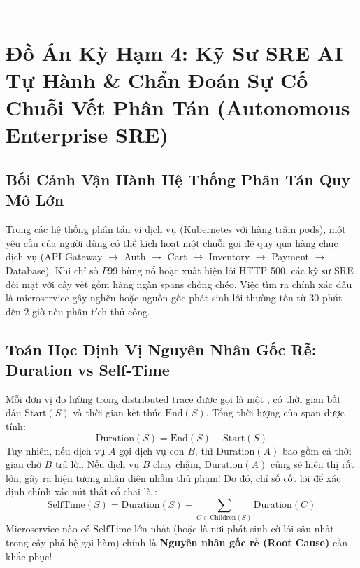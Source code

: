 ---

\section{Đồ Án Kỳ Hạm 4: Kỹ Sư SRE AI Tự Hành \& Chẩn Đoán Sự Cố Chuỗi Vết Phân Tán (Autonomous Enterprise SRE)}
\label{sec:ch14-autonomous-sre}

\subsection{Bối Cảnh Vận Hành Hệ Thống Phân Tán Quy Mô Lớn}
Trong các hệ thống phân tán vi dịch vụ (Kubernetes với hàng trăm pods), một yêu cầu của người dùng có thể kích hoạt một chuỗi gọi đệ quy qua hàng chục dịch vụ (API Gateway $\to$ Auth $\to$ Cart $\to$ Inventory $\to$ Payment $\to$ Database).
Khi chỉ số $P99$ bùng nổ hoặc xuất hiện lỗi HTTP 500, các kỹ sư SRE đối mặt với cây vết  gồm hàng ngàn spans chồng chéo.
Việc tìm ra chính xác đâu là microservice gây nghẽn hoặc nguồn gốc phát sinh lỗi thường tốn từ $30$ phút đến $2$ giờ nếu phân tích thủ công.

\subsection{Toán Học Định Vị Nguyên Nhân Gốc Rễ: Duration vs Self-Time}
Mỗi đơn vị đo lường trong distributed trace được gọi là một , có thời gian bắt đầu $\text{Start}(S)$ và thời gian kết thúc $\text{End}(S)$.
Tổng thời lượng của span được tính:
\begin{equation}
\text{Duration}(S) = \text{End}(S) - \text{Start}(S)
\label{eq:span-duration}
\end{equation}
Tuy nhiên, nếu dịch vụ $A$ gọi dịch vụ con $B$, thì $\text{Duration}(A)$ bao gồm cả thời gian chờ $B$ trả lời. Nếu dịch vụ $B$ chạy chậm, $\text{Duration}(A)$ cũng sẽ hiển thị rất lớn, gây ra hiện tượng nhận diện nhầm thủ phạm!
Do đó, chỉ số cốt lõi để xác định chính xác nút thắt cổ chai là :
\begin{equation}
\text{SelfTime}(S) = \text{Duration}(S) - \sum_{C \in \text{Children}(S)} \text{Duration}(C)
\label{eq:self-time}
\end{equation}
Microservice nào có $\text{SelfTime}$ lớn nhất (hoặc là nơi phát sinh cờ lỗi  sâu nhất trong cây phả hệ gọi hàm) chính là \textbf{Nguyên nhân gốc rễ (Root Cause)} cần khắc phục!

